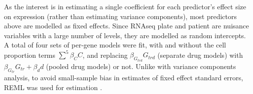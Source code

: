 As the interest is in estimating a single coefficient for each predictor's effect size on expression (rather than estimating variance components), 
most predictors above are modelled as fixed effects.
Since \gls{RNAseq} plate and patient are nuisance variables with a large number of levels, they are modelled as random intercepts.
A total of four sets of per-gene models were fit,
with and without the cell proportion terms $\sum_{}^{5}{\beta_C C}$,
and replacing $\beta_{G_{trd}} G_{trd}$ (separate drug models) with $\beta_{G_{tr}} G_{tr} + \beta_d d$ (pooled drug models) or not.
%
Unlike with variance components analysis,
to avoid small-sample bias in estimates of fixed effect standard errors, \gls{REML} was used for estimation \autocite{mcneish2017SmallSampleMethods}.

